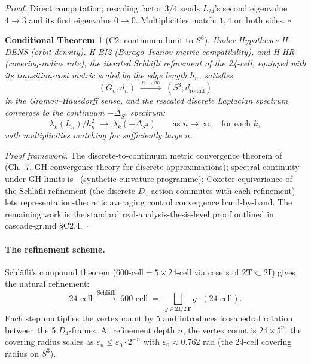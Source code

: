 \documentclass[11pt]{article}
\theoremstyle{plain}
\newtheorem{conditional}[theorem]{Conditional Theorem}
\theoremstyle{definition}
\theoremstyle{remark}
\newcommand{\twoI}{2\mathbf{I}}
\newcommand{\twoT}{2\mathbf{T}}
\begin{document}
\noindent\emph{Proof.} Direct computation; rescaling factor $3/4$ sends $L_{24}$'s second eigenvalue $4 \to 3$ and its first eigenvalue $0 \to 0$. Multiplicities match: $1, 4$ on both sides. \hfill$\square$

\begin{conditional}[C2: continuum limit to $S^3$]\label{cthm:C2}
Under Hypotheses H-DENS (orbit density), H-BI2 (Burago--Ivanov metric compatibility), and H-HR (covering-radius rate), the iterated Schl\"afli refinement of the 24-cell, equipped with its transition-cost metric scaled by the edge length $h_n$, satisfies
\[
  (G_n, d_n) \;\xrightarrow{\,n \to \infty\,}\; (S^3, d_{\mathrm{round}})
\]
in the Gromov--Hausdorff sense, and the rescaled discrete Laplacian spectrum converges to the continuum $-\Delta_{S^3}$ spectrum:
\[
  \lambda_k(L_n) / h_n^2 \;\to\; \lambda_k(-\Delta_{S^3}) \qquad \text{as } n \to \infty, \quad \text{for each } k,
\]
with multiplicities matching for sufficiently large $n$.
\end{conditional}

\noindent\emph{Proof framework.} The discrete-to-continuum metric convergence theorem of~\citet{BuragoIvanov} (Ch.\ 7, GH-convergence theory for discrete approximations); spectral continuity under GH limits is~\citet{CheegerColding} (synthetic curvature programme); Coxeter-equivariance of the Schl\"afli refinement (the discrete $D_4$ action commutes with each refinement) lets representation-theoretic averaging control convergence band-by-band. The remaining work is the standard real-analysis-thesis-level proof outlined in cascade-gr.md \S C2.4. \hfill$\square$

\paragraph{The refinement scheme.}
Schl\"afli's compound theorem ($600\text{-cell} = 5 \times 24\text{-cell}$ via cosets of $\twoT \subset \twoI$) gives the natural refinement:
\[
  24\text{-cell} \;\xrightarrow{\text{Schl\"afli}}\; 600\text{-cell} \;=\; \bigsqcup_{g \in \twoI/\twoT} g \cdot (24\text{-cell}).
\]
Each step multiplies the vertex count by 5 and introduces icosahedral rotation between the 5 $D_4$-frames. At refinement depth $n$, the vertex count is $24 \times 5^n$; the covering radius scales as $\varepsilon_n \le \varepsilon_0 \cdot 2^{-n}$ with $\varepsilon_0 \approx 0.762$ rad (the 24-cell covering radius on $S^3$).
\end{document}
